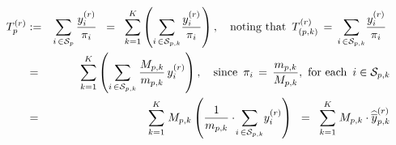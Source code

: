 
\begin{eqnarray*}
T^{(r)}_{p}
& := &
	{\color{black}\underset{i\,\in\mathcal{S}_{p}}{\sum}\,\dfrac{y^{(r)}_{i}}{\pi_{i}}}
\;\; = \;\;
	\overset{K}{\underset{k = 1}{\sum}}
	\left(
		\underset{i\,\in\mathcal{S}_{p,k}}{\sum}\dfrac{y^{(r)}_{i}}{\pi_{i}}
		\right),
	\quad
	\textnormal{noting that
		\,$T^{(r)}_{(p,k)} \,=\, \underset{i\,\in\mathcal{S}_{p,k}}{\sum}\dfrac{y^{(r)}_{i}}{\pi_{i}}$
		}
\\
& = &
	\overset{K}{\underset{k = 1}{\sum}}
	\left(
		\underset{i\,\in\mathcal{S}_{p,k}}{\sum}\,
		\dfrac{M_{p,k}}{m_{p,k}}\,y^{(r)}_{i}
		\right),
	\quad
	\textnormal{since \,$\pi_{i} \,=\, \dfrac{m_{p,k}}{M_{p,k}}$,\, for each \,$i \in \mathcal{S}_{p,k}$}
\\
& = &
	\overset{K}{\underset{k = 1}{\sum}}\;
	M_{p,k}
	\left(
		\dfrac{1}{m_{p,k}}
		\cdot\!
		\underset{i\,\in\mathcal{S}_{p,k}}{\sum}
		y^{(r)}_{i}
		\right)
\;\; = \;\;
	\overset{K}{\underset{k=1}{\sum}}\;
	M_{p,k}
	\cdot
	\widehat{\overline{y}}^{(r)}_{p,k}
\end{eqnarray*}
